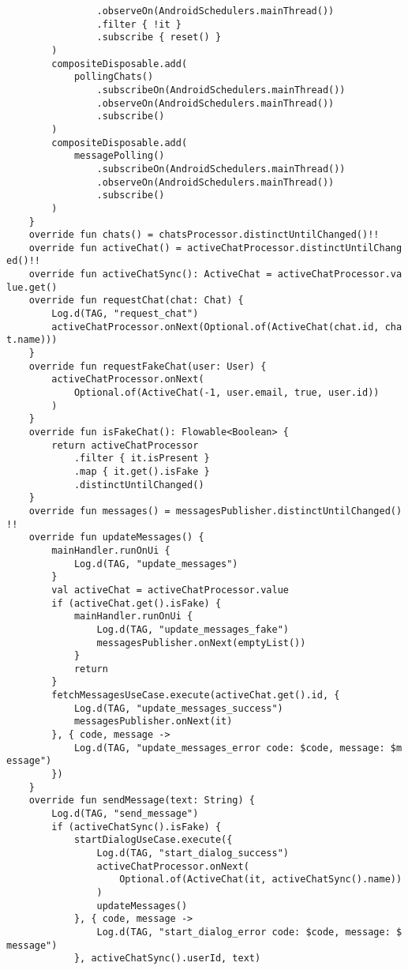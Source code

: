 \documentclass[listing]{espd}
\begin{document}
\begin{verbatim}
                .observeOn(AndroidSchedulers.mainThread())
                .filter { !it }
                .subscribe { reset() }
        )
        compositeDisposable.add(
            pollingChats()
                .subscribeOn(AndroidSchedulers.mainThread())
                .observeOn(AndroidSchedulers.mainThread())
                .subscribe()
        )
        compositeDisposable.add(
            messagePolling()
                .subscribeOn(AndroidSchedulers.mainThread())
                .observeOn(AndroidSchedulers.mainThread())
                .subscribe()
        )
    }
    override fun chats() = chatsProcessor.distinctUntilChanged()!!
    override fun activeChat() = activeChatProcessor.distinctUntilChang
ed()!!
    override fun activeChatSync(): ActiveChat = activeChatProcessor.va
lue.get()
    override fun requestChat(chat: Chat) {
        Log.d(TAG, "request_chat")
        activeChatProcessor.onNext(Optional.of(ActiveChat(chat.id, cha
t.name)))
    }
    override fun requestFakeChat(user: User) {
        activeChatProcessor.onNext(
            Optional.of(ActiveChat(-1, user.email, true, user.id))
        )
    }
    override fun isFakeChat(): Flowable<Boolean> {
        return activeChatProcessor
            .filter { it.isPresent }
            .map { it.get().isFake }
            .distinctUntilChanged()
    }
    override fun messages() = messagesPublisher.distinctUntilChanged()
!!
    override fun updateMessages() {
        mainHandler.runOnUi {
            Log.d(TAG, "update_messages")
        }
        val activeChat = activeChatProcessor.value
        if (activeChat.get().isFake) {
            mainHandler.runOnUi {
                Log.d(TAG, "update_messages_fake")
                messagesPublisher.onNext(emptyList())
            }
            return
        }
        fetchMessagesUseCase.execute(activeChat.get().id, {
            Log.d(TAG, "update_messages_success")
            messagesPublisher.onNext(it)
        }, { code, message ->
            Log.d(TAG, "update_messages_error code: $code, message: $m
essage")
        })
    }
    override fun sendMessage(text: String) {
        Log.d(TAG, "send_message")
        if (activeChatSync().isFake) {
            startDialogUseCase.execute({
                Log.d(TAG, "start_dialog_success")
                activeChatProcessor.onNext(
                    Optional.of(ActiveChat(it, activeChatSync().name))
                )
                updateMessages()
            }, { code, message ->
                Log.d(TAG, "start_dialog_error code: $code, message: $
message")
            }, activeChatSync().userId, text)

\end{verbatim}
\end{document}

